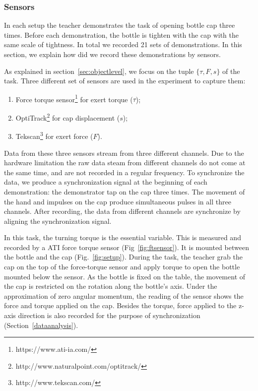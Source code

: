 \subsubsection{Sensors}
\label{sec:sensor}
In each setup the teacher demonstrates the task of opening bottle cap three times. Before each demonstration, the bottle is tighten with the cap with the same scale of tightness. In total we recorded 21 sets of demonstrations. In this section, we explain how did we record these demonstrations by sensors.



As explained in section~\ref{sec:objectlevel}, we focus on the tuple $\{\tau,F,s\}$ of the task. Three different set of sensors are used in the experiment to capture them:

\begin{enumerate}
\item Force torque sensor\footnote{https://www.ati-ia.com/} for exert torque ($\tau$);
\item OptiTrack\footnote{http://www.naturalpoint.com/optitrack/} for cap displacement ($s$);
\item Tekscan\footnote{http://www.tekscan.com/} for exert force ($F$).
\end{enumerate}

Data from these three sensors stream from three different channels. Due to the hardware limitation the raw data steam from different channels do not come at the same time, and are not recorded in a regular frequency. To synchronize the data, we produce a synchronization signal at the beginning of each demonstration: the demonstrator tap on the cap three times. The movement of the hand and impulses on the cap produce simultaneous pulses in all three channels. After recording, the data from different channels are synchronize by aligning the synchronization signal.

In this task, the turning torque is the essential variable. This is measured and recorded by a ATI force torque sensor (Fig~\ref{fig:ftsensor}). It is mounted between the bottle and the cap (Fig.~\ref{fig:setup}). During the task, the teacher grab the cap on the top of the force-torque sensor and apply torque to open the bottle mounted below the sensor. As the bottle is fixed on the table, the movement of the cap is restricted on the rotation along the bottle's axis. Under the approximation of zero angular momentum, the reading of the sensor shows the force and torque applied on the cap. Besides the torque, force applied to the z-axis direction is also recorded for the purpose of synchronization (Section~\ref{dataanalysis}).

